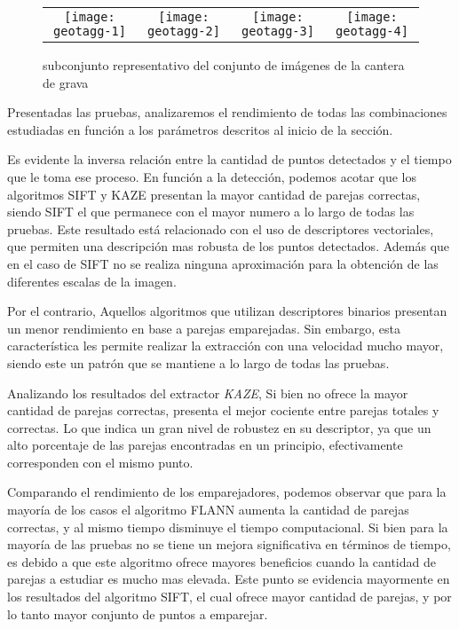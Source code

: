 \begin{figure}[h]
	\centering
	\begin{tabular}{@{}cccc@{}}
		\texttt{[image: geotagg-1]} &
		\texttt{[image: geotagg-2]} &
		\texttt{[image: geotagg-3]} &
		\texttt{[image: geotagg-4]} 
	\end{tabular}
	\caption{subconjunto representativo del conjunto de imágenes de la cantera de grava}
	\label{imagen:geotag}
\end{figure}

Presentadas las pruebas, analizaremos el rendimiento de todas las combinaciones estudiadas en función a los parámetros descritos al inicio de la sección.

Es evidente la inversa relación entre la cantidad de puntos detectados y el tiempo que le toma ese proceso. En función a la detección, podemos acotar que los algoritmos SIFT y KAZE presentan la mayor cantidad de parejas correctas, siendo SIFT el que permanece con el mayor numero a lo largo de todas las pruebas. Este resultado está relacionado con el uso de descriptores vectoriales, que permiten una descripción mas robusta de los puntos detectados. Además que en el caso de SIFT no se realiza ninguna aproximación para la obtención de las diferentes escalas de la imagen.

Por el contrario, Aquellos algoritmos que utilizan descriptores binarios presentan un menor rendimiento en base a parejas emparejadas. Sin embargo, esta característica les permite realizar la extracción con una velocidad mucho mayor, siendo este un patrón que se mantiene a lo largo de todas las pruebas.

Analizando los resultados del extractor \textit{KAZE}, Si bien no ofrece la mayor cantidad de parejas correctas, presenta el mejor cociente entre parejas totales y correctas. Lo que indica un gran nivel de robustez en su descriptor, ya que un alto porcentaje de las parejas encontradas en un principio, efectivamente corresponden con el mismo punto.

Comparando el rendimiento de los emparejadores, podemos observar que para la mayoría de los casos el algoritmo FLANN aumenta la cantidad de parejas correctas, y al mismo tiempo disminuye el tiempo computacional. Si bien para la mayoría de las pruebas no se tiene un mejora significativa en términos de tiempo, es debido a que este algoritmo ofrece mayores beneficios cuando la cantidad de parejas a estudiar es mucho mas elevada. Este punto se evidencia mayormente en los resultados del algoritmo SIFT, el cual ofrece mayor cantidad de parejas, y por lo tanto mayor conjunto de puntos a emparejar.

